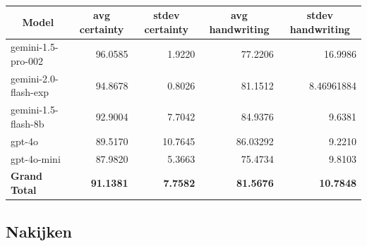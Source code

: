 \documentclass[12pt]{article}
\begin{document}
\noindent\begin{table}[H]
\caption{}
\label{fig:certainty-model}
\begin{tabularx}{\textwidth}{X *4{r}}
    \toprule
    \multicolumn{1}{c}{\textbf{Model}} & \multicolumn{1}{c}{\textbf{avg  certainty}} & \multicolumn{1}{c}{\textbf{stdev certainty}} & \multicolumn{1}{c}{\textbf{avg handwriting}} & \multicolumn{1}{c}{\textbf{stdev handwriting}} \\
    \midrule
    gemini-1.5-pro-002 & 96.0585 & 1.9220 & 77.2206 & 16.9986 \\
    gemini-2.0-flash-exp & 94.8678 & 0.8026 & 81.1512 & 8.46961884 \\
    gemini-1.5-flash-8b & 92.9004 & 7.7042 & 84.9376 & 9.6381 \\
    gpt-4o & 89.5170 & 10.7645 & 86.03292 & 9.2210 \\
    gpt-4o-mini & 87.9820 & 5.3663 & 75.4734 & 9.8103 \\
    \midrule
    \textbf{Grand Total} & \textbf{91.1381} & \textbf{7.7582} & \textbf{81.5676} & \textbf{10.7848} \\
    \bottomrule
\end{tabularx}%
\end{table}

\pagebreak
\subsection{Nakijken}
\pagebreak
\end{document}
